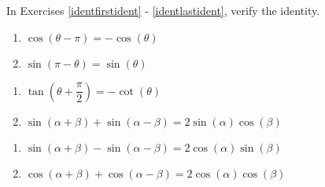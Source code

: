 In Exercises \ref{identfirstident} - \ref{identlastident}, verify the identity.

\begin{multicols}{2}

\begin{enumerate}

\setcounter{enumi}{\value{HW}}

\item $\cos(\theta - \pi) = -\cos(\theta)$ \label{identfirstident}
\item $\sin(\pi - \theta) = \sin(\theta)$

\setcounter{HW}{\value{enumi}}

\end{enumerate}

\end{multicols}

\begin{multicols}{2}

\begin{enumerate}

\setcounter{enumi}{\value{HW}}

\item $\tan\left(\theta + \dfrac{\pi}{2} \right) = -\cot(\theta)$
\item $\sin(\alpha + \beta) + \sin(\alpha - \beta) = 2\sin(\alpha)\cos(\beta)$ 

\setcounter{HW}{\value{enumi}}

\end{enumerate}

\end{multicols}

\begin{multicols}{2}

\begin{enumerate}

\setcounter{enumi}{\value{HW}}

\item $\sin(\alpha + \beta) - \sin(\alpha - \beta) = 2\cos(\alpha) \sin(\beta)$
\item $\cos(\alpha + \beta) + \cos(\alpha - \beta) = 2\cos(\alpha) \cos(\beta)$

\setcounter{HW}{\value{enumi}}

\end{enumerate}

\end{multicols}

